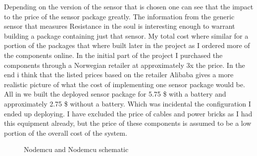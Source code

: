 \documentclass[]{uiophd}
\begin{document}
Depending on the version of the sensor that is chosen one can see that the impact to the price of the sensor package greatly. The information from the generic sensor that measures Resistance in the soul is interesting enough to warrant building a package containing just that sensor. My total cost where similar for a portion of the packages that where built later in the project as I ordered more of the components online. In the initial part of the project I purchased the components through a Norwegian retailer at approximately 3x the price. In the end i think that the listed prices based on the retailer Alibaba gives a more realistic picture of what the cost of implementing one sensor package would be. All in we built the deployed sensor package for 5.75 \$ with a battery and approximately 2.75 \$ without a battery. Which was incidental the configuration I ended up deploying. I have excluded the price of cables and power bricks as I had this equipment already, but the price of these components is assumed to be a low portion of the overall cost of the system.


\begin{figure}[h]
\caption{Nodemcu and Nodemcu schematic}%
\centering
    \qquad
    
    \label{fig:example}%
\end{figure}
\end{document}
